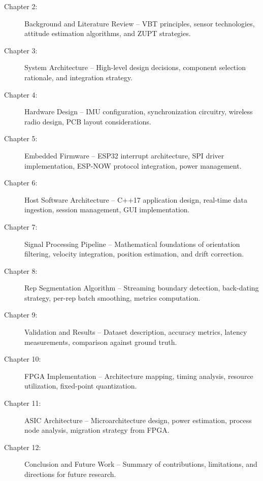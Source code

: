 \begin{description}
    \item[Chapter 2:] Background and Literature Review -- VBT principles, sensor technologies, attitude estimation algorithms, and ZUPT strategies.

    \item[Chapter 3:] System Architecture -- High-level design decisions, component selection rationale, and integration strategy.

    \item[Chapter 4:] Hardware Design -- IMU configuration, synchronization circuitry, wireless radio design, PCB layout considerations.

    \item[Chapter 5:] Embedded Firmware -- ESP32 interrupt architecture, SPI driver implementation, ESP-NOW protocol integration, power management.

    \item[Chapter 6:] Host Software Architecture -- C++17 application design, real-time data ingestion, session management, GUI implementation.

    \item[Chapter 7:] Signal Processing Pipeline -- Mathematical foundations of orientation filtering, velocity integration, position estimation, and drift correction.

    \item[Chapter 8:] Rep Segmentation Algorithm -- Streaming boundary detection, back-dating strategy, per-rep batch smoothing, metrics computation.

    \item[Chapter 9:] Validation and Results -- Dataset description, accuracy metrics, latency measurements, comparison against ground truth.

    \item[Chapter 10:] FPGA Implementation -- Architecture mapping, timing analysis, resource utilization, fixed-point quantization.

    \item[Chapter 11:] ASIC Architecture -- Microarchitecture design, power estimation, process node analysis, migration strategy from FPGA.

    \item[Chapter 12:] Conclusion and Future Work -- Summary of contributions, limitations, and directions for future research.
\end{description}
